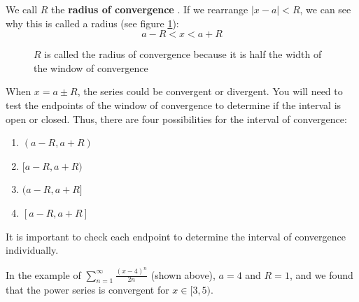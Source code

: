 We call $R$ the \textbf{radius of convergence} . 
If we rearrange $|x - a| < R$, we can see why this is called a radius (see 
figure \ref{fig:radiusofconv}): 
$$a - R < x < a + R$$

\begin{figure}[H]
\centering
    \caption{$R$ is called the radius of convergence because it is half the 
    width of the window of convergence}
    \label{fig:radiusofconv}
\end{figure}

When $x = a \pm R$, the series could be convergent or divergent. You will need 
to test the endpoints of the window of convergence to determine if the 
interval is open or closed. Thus, there are four possibilities for the interval 
of convergence:
\begin{enumerate}
\item $(a - R, a + R)$
\item$[a - R, a + R)$
\item$(a - R, a + R]$
\item$[a - R, a + R]$
\end{enumerate}

It is important to check each endpoint to determine the interval of convergence individually. 

In the example of $\sum_{n=1}^\infty \frac{(x-4)^n}{2n}$ (shown above), 
$a = 4$ and $R = 1$, and we found that the power series is convergent for
$x \in [3, 5)$.

